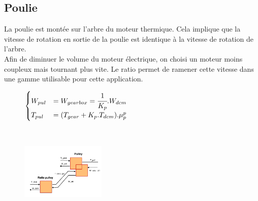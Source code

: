 \newpage
\subsection{Poulie}
La poulie est montée sur l'arbre du moteur thermique. Cela implique que la vitesse de rotation en sortie de la poulie est identique à la vitesse de rotation de l'arbre. \\
Afin de diminuer le volume du moteur électrique, on choisi un moteur moins coupleux mais tournant plus vite. Le ratio permet de ramener cette vitesse dans une gamme utilisable pour cette application.
\vspace{-20px}
\begin{figure}[ht]
\centering
\begin{minipage}{.5\textwidth}  
\centering
$\begin{cases}
	W_{pul} &= W_{gearbox} = \cfrac{1}{K_p}.W_{dcm} \\
	T_{pul} &= (T_{gear}+K_p.T_{dcm}).\mu{}_p^{p}
\end{cases}$
\end{minipage}~
\begin{minipage}{.5\textwidth}
  \centering
\includegraphics[height=100px]{images/Pulley.png}
\end{minipage}
\end{figure}
\FloatBarrier
\vspace{-30px}

